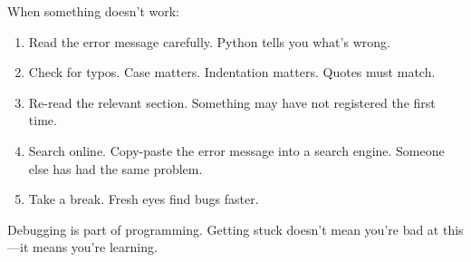 When something doesn't work:

\begin{enumerate}
    \item Read the error message carefully. Python tells you what's wrong.
    \item Check for typos. Case matters. Indentation matters. Quotes must match.
    \item Re-read the relevant section. Something may have not registered the first time.
    \item Search online. Copy-paste the error message into a search engine. Someone else has had the same problem.
    \item Take a break. Fresh eyes find bugs faster.
\end{enumerate}

Debugging is part of programming. Getting stuck doesn't mean you're bad at this---it means you're learning.
